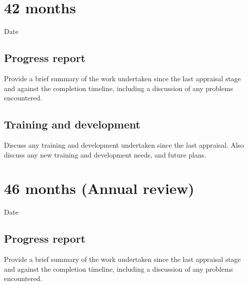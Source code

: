 \documentclass[12pt,a4paper]{article}
\begin{document}
\section{42 months}

\begin{description}
	\item[Date] %
\end{description}

\subsection{Progress report}
Provide a brief summary of the work undertaken since the last appraisal stage and against the completion timeline, including a discussion of any problems encountered. %

\subsection{Training and development}
Discuss any training and development undertaken since the last appraisal. Also discuss any new training and development needs, and future plans. %


\section{46 months (Annual review)}

\begin{description}
	\item[Date] %
\end{description}

\subsection{Progress report}
Provide a brief summary of the work undertaken since the last appraisal stage and against the completion timeline, including a discussion of any problems encountered. %
\end{document}
